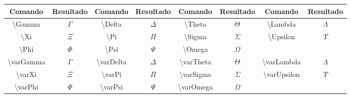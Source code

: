 % 
% 
% 
% 
% 
\begin{tabular}{cc|cc|cc|cc}
    \hline
    Comando & Resultado & Comando & Resultado & Comando & Resultado & Comando & Resultado \\ \hline
    \textbackslash\textsf{Gamma} & $\Gamma$ & \textbackslash\textsf{Delta} & $\Delta$ & \textbackslash\textsf{Theta} & $\Theta$ & \textbackslash\textsf{Lambda} & $\Lambda$ \\
    \textbackslash\textsf{Xi} & $\Xi$ & \textbackslash\textsf{Pi} & $\Pi$ & \textbackslash\textsf{Sigma} & $\Sigma$ & \textbackslash\textsf{Upsilon} & $\Upsilon$ \\
    \textbackslash\textsf{Phi} & $\Phi$ & \textbackslash\textsf{Psi} & $\Psi$ & \textbackslash\textsf{Omega} & $\Omega$ \\
    \textbackslash\textsf{varGamma} & $\varGamma$ & \textbackslash\textsf{varDelta} & $\varDelta$ & \textbackslash\textsf{varTheta} & $\varTheta$ & \textbackslash\textsf{varLambda} & $\varLambda$ \\
    \textbackslash\textsf{varXi} & $\varXi$ & \textbackslash\textsf{varPi} & $\varPi$ & \textbackslash\textsf{varSigma} & $\varSigma$ & \textbackslash\textsf{varUpsilon} & $\varUpsilon$ \\
    \textbackslash\textsf{varPhi} & $\varPhi$ & \textbackslash\textsf{varPsi} & $\varPsi$ &
    \textbackslash\textsf{varOmega} & $\varOmega$ & & \\ \hline
\end{tabular}
